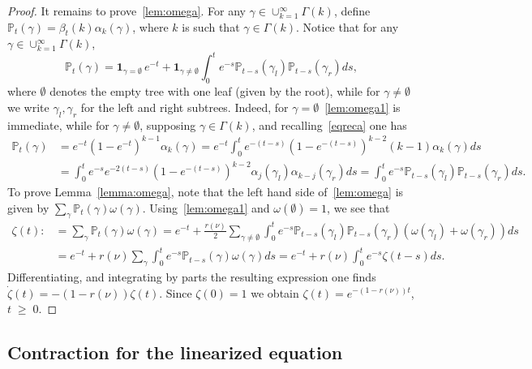 \documentclass[10pt,a4paper]{article}
\renewcommand{\geq}{\;\geqslant\;}
\newcommand{\ind}{\mathbf{1}}
\newcommand{\bbP}{\mathbb{P}}
\let\a=\alpha
\let\b=\beta
\let\g=\gamma
\let\o=\omega
\let\z=\zeta
\let\G=\Gamma
\begin{document}
\begin{proof}
It remains to prove~\eqref{lem:omega}. For any $\g\in\cup_{k=1}^\infty\G(k)$, define $\bbP_t(\g) = \b_t(k)\alpha_k(\g)$, where $k$ is such that $\g\in\G(k)$. Notice that for any $\g\in\cup_{k=1}^\infty\G(k)$,
\begin{equation}\label{lem:omega1}
\bbP_t(\g) = \ind_{\g=\emptyset}\,e^{-t} + \ind_{\g\neq \emptyset}\int_0^t e^{-s}\bbP_{t-s}(\g_l)\bbP_{t-s}(\g_r)ds,
\end{equation}
where $\emptyset$ denotes the empty tree with one leaf (given by the root), while for $\g\neq \emptyset$ we write $\g_l,\g_r$ for the left and right subtrees. Indeed, for $\g=\emptyset$~\eqref{lem:omega1} is immediate, while for $\g\neq\emptyset$, supposing $\g\in\G(k)$, and recalling~\eqref{eqreca} one has
\begin{align*}
\bbP_{t}(\g) &= e^{-t}\left(1-e^{-t}\right)^{k-1}\a_k(\g) = e^{-t}\int_0^{t}e^{-(t-s)}\left(1-e^{-(t-s)}\right)^{k-2}(k-1)\a_k(\g)ds\\ &=
\int_0^t e^{-s}e^{-2(t-s)}\left(1-e^{-(t-s)}\right)^{k-2}\a_j(\g_l)\a_{k-j}(\g_r)ds =\int_0^t e^{-s} \bbP_{t-s}(\g_l)\bbP_{t-s}(\g_r)ds.
\end{align*}
To prove Lemma~\ref{lemma:omega}, note that the left hand side of~\eqref{lem:omega} is given by $\sum_\g \bbP_t(\g)\o(\g)$. Using~\eqref{lem:omega1} and $\o(\emptyset)=1$, we see that
\begin{align*}
\z(t):&=\sum_\g\bbP_{t}(\g)\o(\g) =e^{-t} +\frac{r(\nu)}2
\sum_{\g\neq\emptyset}\int_0^t e^{-s} \bbP_{t-s}(\g_l)\bbP_{t-s}(\g_r)(\o(\g_l)+\o(\g_r))ds\\
&=e^{-t} +r(\nu)
\sum_{\g}\int_0^t e^{-s} \bbP_{t-s}(\g)\o(\g)ds=e^{-t} +r(\nu)
\int_0^t e^{-s} \z(t-s)ds.
\end{align*}
Differentiating, and integrating by parts the resulting expression one finds $\dot\z(t) = -(1-r(\nu))\z(t)$. Since $\z(0)=1$ we obtain $\z(t)=e^{-(1-r(\nu))t}$, $t\geq 0$.
\end{proof}

\subsection{Contraction for the linearized equation}
\end{document}
